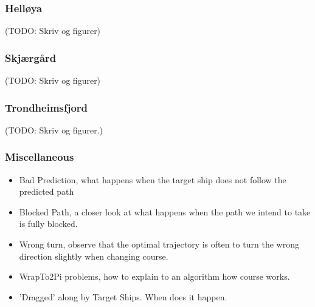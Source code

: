 \subsubsection{Helløya}
(TODO: Skriv og figurer)

\subsubsection{Skjærgård}
(TODO: Skriv og figurer)

\subsubsection{Trondheimsfjord}
(TODO: Skriv og figurer.)

\subsubsection{Miscellaneous}
\begin{itemize}
    \item Bad Prediction, what happens when the target ship does not follow the predicted path
    \item Blocked Path, a closer look at what happens when the path we intend to take is fully blocked.
    \item Wrong turn, observe that the optimal trajectory is often to turn the wrong direction slightly when changing course.
    \item WrapTo2Pi problems, how to explain to an algorithm how course works.
    \item 'Dragged' along by Target Ships. When does it happen.
\end{itemize}

